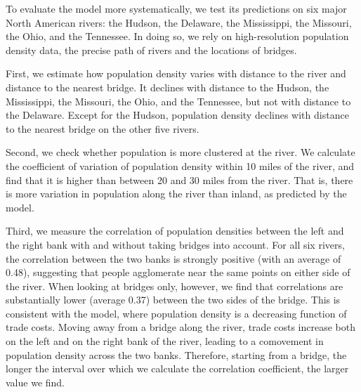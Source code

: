 \documentclass[12pt]{article}
\begin{document}
To evaluate the model more systematically, we test its predictions on six
major North American rivers: the Hudson, the Delaware, the Mississippi, the
Missouri, the Ohio, and the Tennessee. In doing so, we rely on
high-resolution population density data, the precise path of rivers and the
locations of bridges.

First, we estimate how population density varies with distance to the river
and distance to the nearest bridge. It declines with distance to the Hudson,
the Mississippi, the Missouri, the Ohio, and the Tennessee, but not with
distance to the Delaware. Except for the Hudson, population density declines
with distance to the nearest bridge on the other five rivers.

Second, we check whether population is more clustered at the river. We
calculate the coefficient of variation of population density within 10 miles
of the river, and find that it is higher than between 20 and 30 miles from
the river. That is, there is more variation in population along the river
than inland, as predicted by the model.

Third, we measure the correlation of population densities between the left
and the right bank with and without taking bridges into account. For all six
rivers, the correlation between the two banks is strongly positive (with an
average of 0.48), suggesting that people agglomerate near the same points on
either side of the river. When looking at bridges only, however, we find
that correlations are substantially lower (average 0.37) between the two
sides of the bridge. This is consistent with the model, where population
density is a decreasing function of trade costs. Moving away from a bridge
along the river, trade costs increase both on the left and on the right bank
of the river, leading to a comovement in population density across the two
banks. Therefore, starting from a bridge, the longer the interval over which
we calculate the correlation coefficient, the larger value we find.

\bigskip
\end{document}
